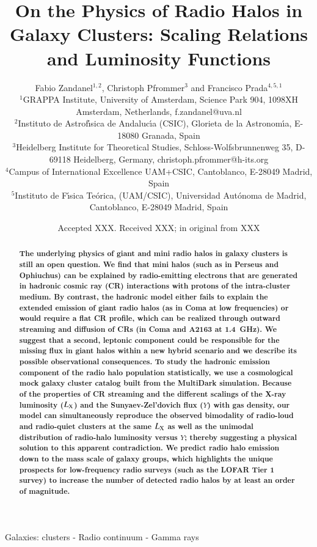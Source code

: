 \documentclass[useAMS,usenatbib]{mn2e}
\title[On the Physics of Radio Halos in Galaxy Clusters]{On the Physics of Radio Halos in Galaxy Clusters: Scaling Relations and Luminosity Functions}
\author[F. Zandanel, C. Pfrommer and F. Prada]{
Fabio Zandanel$^{1,2}$, Christoph Pfrommer$^{3}$ and Francisco Prada$^{4,5,1}$\\
$^{1}$GRAPPA Institute, University of Amsterdam, Science Park 904, 1098XH Amsterdam, Netherlands, f.zandanel@uva.nl\\
$^{2}$Instituto de Astrof\'{\i}sica de Andaluc\'{\i}a (CSIC), Glorieta de la Astronom\'{\i}a, E-18080 Granada, Spain\\
$^{3}$Heidelberg Institute for Theoretical Studies, Schloss-Wolfsbrunnenweg 35, D-69118 Heidelberg, Germany, christoph.pfrommer@h-its.org\\
$^{4}$Campus of International Excellence UAM+CSIC, Cantoblanco, E-28049 Madrid, Spain\\
$^{5}$Instituto de F\'{\i}sica Te\'orica, (UAM/CSIC), Universidad Aut\'onoma de Madrid, Cantoblanco, E-28049 Madrid, Spain}
\begin{document}
\date{Accepted XXX. Received XXX; in original from XXX}

\pagerange{\pageref{firstpage}--\pageref{lastpage}} 

\maketitle

\label{firstpage}

\begin{abstract}
  {\bf The underlying physics of giant and mini radio halos in galaxy clusters
    is still an open question. We find that mini halos (such as in Perseus and
    Ophiuchus) can be explained by radio-emitting electrons that are generated
    in hadronic cosmic ray (CR) interactions with protons of the intra-cluster
    medium. By contrast, the hadronic model either fails to explain the extended
    emission of giant radio halos (as in Coma at low frequencies) or would
    require a flat CR profile, which can be realized through outward streaming
    and diffusion of CRs (in Coma and A2163 at 1.4~GHz).  We suggest that a
    second, leptonic component could be responsible for the missing flux in
    giant halos within a new hybrid scenario and we describe its possible
    observational consequences.  To study the hadronic emission component of the
    radio halo population statistically, we use a cosmological mock galaxy
    cluster catalog built from the MultiDark simulation. Because of the
    properties of CR streaming and the different scalings of the X-ray
    luminosity ($L_{{\mathrm{X}}}$) and the Sunyaev-Zel'dovich flux ($Y$) with gas
    density, our model can simultaneously reproduce the observed bimodality of
    radio-loud and radio-quiet clusters at the same $L_{{\mathrm{X}}}$ as well as the
    unimodal distribution of radio-halo luminosity versus $Y$; thereby
    suggesting a physical solution to this apparent contradiction. We predict
    radio halo emission down to the mass scale of galaxy groups, which
    highlights the unique prospects for low-frequency radio surveys (such as the
    LOFAR Tier 1 survey) to increase the number of detected radio halos by at
    least an order of magnitude.}
\end{abstract}

\begin{keywords}
  Galaxies: clusters - Radio continuum - Gamma rays
\end{keywords}
\end{document}
